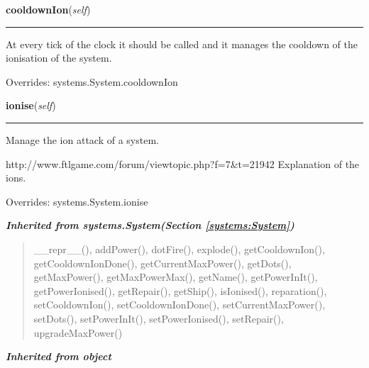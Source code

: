     \vspace{0.5ex}

\hspace{.8\funcindent}\begin{boxedminipage}{\funcwidth}

    \raggedright \textbf{cooldownIon}(\textit{self})

    \vspace{-1.5ex}

    \rule{\textwidth}{0.5\fboxrule}
\setlength{\parskip}{2ex}
    At every tick of the clock it should be called and it manages the 
    cooldown of the ionisation of the system.

\setlength{\parskip}{1ex}
      Overrides: systems.System.cooldownIon

    \end{boxedminipage}

    \vspace{0.5ex}

\hspace{.8\funcindent}\begin{boxedminipage}{\funcwidth}

    \raggedright \textbf{ionise}(\textit{self})

    \vspace{-1.5ex}

    \rule{\textwidth}{0.5\fboxrule}
\setlength{\parskip}{2ex}
    Manage the ion attack of a system.

    http://www.ftlgame.com/forum/viewtopic.php?f=7\&t=21942 Explanation of 
    the ions.

\setlength{\parskip}{1ex}
      Overrides: systems.System.ionise

    \end{boxedminipage}


\large{\textbf{\textit{Inherited from systems.System\textit{(Section \ref{systems:System})}}}}

\begin{quote}
\_\_repr\_\_(), addPower(), dotFire(), explode(), getCooldownIon(), getCooldownIonDone(), getCurrentMaxPower(), getDots(), getMaxPower(), getMaxPowerMax(), getName(), getPowerInIt(), getPowerIonised(), getRepair(), getShip(), isIonised(), reparation(), setCooldownIon(), setCooldownIonDone(), setCurrentMaxPower(), setDots(), setPowerInIt(), setPowerIonised(), setRepair(), upgradeMaxPower()
\end{quote}

\large{\textbf{\textit{Inherited from object}}}

